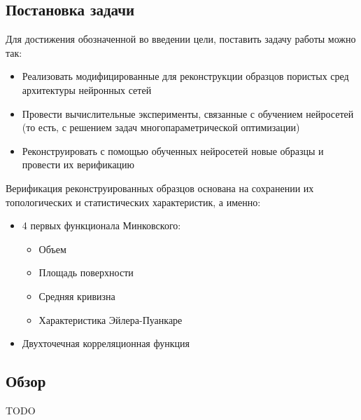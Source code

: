 	\subsection*{Постановка задачи}
	
	Для достижения обозначенной во введении цели, поставить задачу работы можно так:
	
	\begin{itemize}
		\item Реализовать модифицированные для реконструкции образцов пористых сред архитектуры нейронных сетей
		\item Провести вычислительные эксперименты, связанные с обучением нейросетей (то есть, с решением задач многопараметрической оптимизации)
		\item Реконструировать с помощью обученных нейросетей новые образцы и провести их верификацию
	\end{itemize}

	Верификация реконструированных образцов основана на сохранении их топологических и статистических характеристик, а именно:
	
	\begin{itemize}
		\item 4 первых функционала Минковского:
		\begin{itemize}
			\item Объем
			\item Площадь поверхности
			\item Средняя кривизна
			\item Характеристика Эйлера-Пуанкаре
		\end{itemize}
		\item Двухточечная корреляционная функция
	\end{itemize}
	
	\subsection*{Обзор}
	TODO